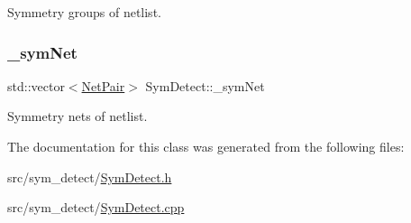 Symmetry groups of netlist. 

\mbox{\label{classSymDetect_a09a99c8eef474364f9fe2e27603ea686}} 
\subsubsection{\texorpdfstring{\+\_\+sym\+Net}{\_symNet}}
{\footnotesize\ttfamily std\+::vector$<$\hyperlink{classNetPair}{Net\+Pair}$>$ Sym\+Detect\+::\+\_\+sym\+Net\hspace{0.3cm}{\ttfamily [private]}}



Symmetry nets of netlist. 



The documentation for this class was generated from the following files\+:\begin{DoxyCompactItemize}
\item 
src/sym\+\_\+detect/\hyperlink{SymDetect_8h}{Sym\+Detect.\+h}\item 
src/sym\+\_\+detect/\hyperlink{SymDetect_8cpp}{Sym\+Detect.\+cpp}\end{DoxyCompactItemize}
